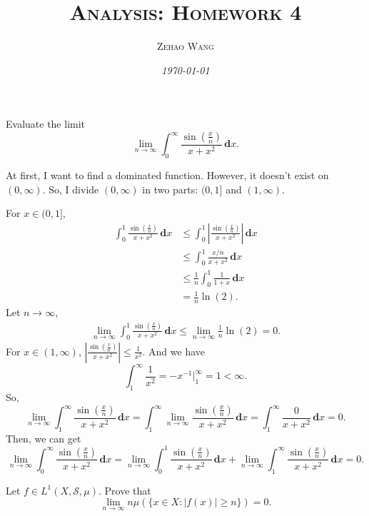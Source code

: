\documentclass[12pt]{article}
\title{\textsc{Analysis: Homework 4}}
\author{\textsc{Zehao Wang}}
\date{\emph{\today}}
\newenvironment{exercise}[1]{\begin{tcolorbox}[colback=black!15, colframe=black!80, breakable, title=#1]}{\end{tcolorbox}}
\newenvironment{solution}{\begin{tcolorbox}[colback=white, colframe=black!50, breakable, title=Solution. ]\setlength{\parskip}{0.8em}}{\end{tcolorbox}}
\newcommand{\der}{\,\mathbf{d}}
\begin{document}
    \maketitle

    \begin{exercise}{1}
        Evaluate the limit
        \[
            \lim_{n\to \infty}\int_0^\infty\frac{\sin\left(\frac{x}{n}\right)}{x+x^2}\der x. 
        \]
    \end{exercise}

    \begin{solution}
        At first, I want to find a dominated function. However, it doesn't exist on $(0,\infty)$. So, I divide $(0,\infty)$ in two parts: $(0,1]$ and $(1,\infty)$. 

        For $x\in (0,1]$, 
        \[
            \begin{aligned}
                \int_0^1\frac{\sin\left(\frac{x}{n}\right)}{x+x^2}\der x & \leqslant\int_0^1\left|\frac{\sin\left(\frac{x}{n}\right)}{x+x^2}\right|\der x\\
                & \leqslant\int_0^1\frac{x/n}{x+x^2}\der x\\
                & \leqslant\frac{1}{n}\int_0^1\frac{1}{1+x}\der x\\
                & =\frac{1}{n}\ln(2). 
            \end{aligned}
        \]
        Let $n\to\infty$, 
        \[
            \begin{aligned}
                \lim_{n\to\infty}\int_0^1\frac{\sin\left(\frac{x}{n}\right)}{x+x^2}\der x \leqslant\lim_{n\to\infty}\frac{1}{n}\ln(2)=0. 
            \end{aligned}
        \]
        For $x\in(1,\infty)$, $\left|\frac{\sin\left(\frac{x}{n}\right)}{x+x^2}\right|\leqslant\frac{1}{x^2}$. And we have
        \[
            \int_1^\infty\frac{1}{x^2}=-x^{-1}\big|_1^\infty=1<\infty. 
        \]
        So, 
        \[
            \lim_{n\to\infty}\int_1^\infty\frac{\sin\left(\frac{x}{n}\right)}{x+x^2}\der x =\int_1^\infty\lim_{n\to\infty}\frac{\sin\left(\frac{x}{n}\right)}{x+x^2}\der x=\int_1^\infty\frac{0}{x+x^2}\der x=0. 
        \]
        Then, we can get
        \[
            \lim_{n\to \infty}\int_0^\infty\frac{\sin\left(\frac{x}{n}\right)}{x+x^2}\der x=\lim_{n\to \infty}\int_0^1\frac{\sin\left(\frac{x}{n}\right)}{x+x^2}\der x+\lim_{n\to \infty}\int_1^\infty\frac{\sin\left(\frac{x}{n}\right)}{x+x^2}\der x=0. 
        \]
    \end{solution}

    \begin{exercise}{2}
        Let $f\in L^1(X,\mathscr{S},\mu)$. Prove that
        \[
            \lim_{n\to\infty}n\mu(\{x\in X: |f(x)|\geqslant n\})=0. 
        \]
    \end{exercise}
\end{document}
